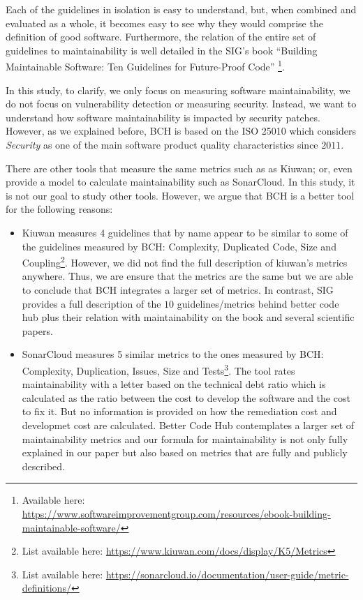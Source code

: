 \documentclass[11pt,fleqn]{article}
\begin{document}
Each of the guidelines in isolation is easy to understand, but, when 
combined and evaluated as a whole, it becomes easy to see why 
they would comprise the definition of good software. Furthermore, the relation of the entire set of
guidelines to maintainability is well detailed in the SIG's book ``Building Maintainable 
Software: Ten Guidelines for Future-Proof Code''
\footnote{Available here: 
\url{https://www.softwareimprovementgroup.com/resources/ebook-building-maintainable-software/}}.

In this study, to clarify, we only focus on measuring software maintainability, we do not focus 
on vulnerability detection or measuring security. Instead, we want to understand how software 
maintainability is impacted by security patches. However, as we explained before, BCH is 
based on the ISO 25010 which considers \emph{Security} as one of the main software product quality 
characteristics since $2011$.

There are other tools that measure the same metrics such as as Kiuwan; or, even 
provide a model to calculate maintainability such as SonarCloud. In this study, it is not
our goal to study other tools. However, we argue
that BCH is a better tool for the following reasons:

\begin{itemize}
    \item Kiuwan measures 4 guidelines that by name appear to be similar to 
    some of the guidelines measured by BCH: Complexity, Duplicated 
    Code, Size and Coupling\footnote{List available here: \url{https://www.kiuwan.com/docs/display/K5/Metrics}}. 
    However, we did not find the full description of kiuwan's metrics anywhere. Thus, 
    we are ensure that the metrics are the same but we are able to conclude that
    BCH integrates a larger set of metrics.  
    In contrast, 
    SIG provides a full description of the $10$ guidelines/metrics behind better code
    hub plus their relation with maintainability on the book and several scientific papers. 
    \item SonarCloud measures 5 similar metrics to the ones measured by BCH: Complexity, Duplication, 
    Issues, Size and Tests\footnote{List available here: \url{https://sonarcloud.io/documentation/user-guide/metric-definitions/}}. 
    The tool rates maintainability with a letter based on the technical 
    debt ratio which is calculated as the ratio between the cost to develop 
    the software and the cost to fix it. But no information is provided 
    on how the remediation cost and developmet cost are calculated. 
    Better Code Hub contemplates a larger set of maintainability metrics 
    and our formula for maintainability is not only fully explained in our paper but also 
    based on metrics that are fully and publicly described.  
\end{itemize}
\end{document}
